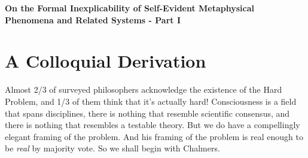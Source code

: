 \documentclass[runningheads]{llncs}
\begin{document}
\begin{center}
	{\Large\bfseries\boldmath
		On the Formal Inexplicability of Self-Evident Metaphysical Phenomena and Related Systems - Part I
		\par}
	\vskip 0.8cm
\end{center}

\begin{abstract}
Since Descartes first proclaimed "cogito, ergo sum" all the way back in 1637, "I think, therefore I am" has become the Declaration of Independence for consciousness. Chalmers' informed us of the fact that science has a constitutionally Hard Problem on their hands. If he's as right as we believe he is, conscious experience may forever elude our most powerful explanatory framework for physical phenomena. In other news, a group referring to themselves as the \textit{IIT-Concerned} recently proclaimed in Nature Neuroscience that any theory of consciousness that can't stand up to the scrutiny of science shall be deemed "unscientific." And the emergence of Semantic AI has transformed this philosophical oddity into a practical concern with real ethical implications. We simply cannot know whether AI systems are conscious without first knowing the necessary and sufficient conditions for consciousness. How can we provide a formal definition of conscious experience that preserves the essence of its metaphysical character in a framework that is physically falsifiable? 
		
\end{abstract}

\section{A Colloquial Derivation}

Almost 2/3 of surveyed philosophers acknowledge the existence of the Hard Problem, and 1/3 of them think that it's actually hard! \cite{BourgetChalmers2023} Consciousness is a field that spans disciplines, there is nothing that resemble scientific consensus, and there is nothing that resembles a testable theory. But we do have a compellingly elegant framing of the problem. And his framing of the problem is real enough to be \textit{real} by majority vote. So we shall begin with Chalmers.
\end{document}
